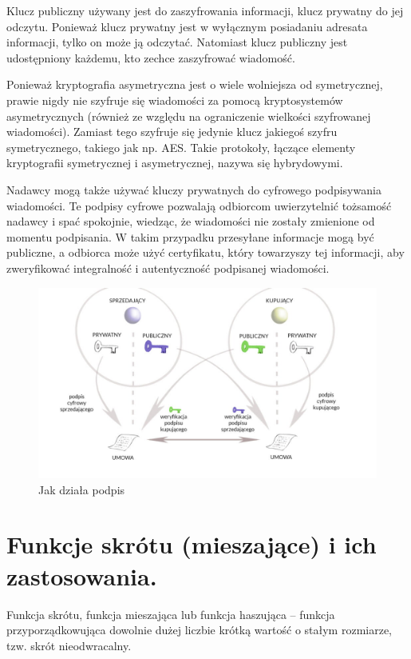 \documentclass[a4paper,12pt,oneside]{book}
\begin{document}
			Klucz publiczny używany jest do zaszyfrowania informacji, klucz prywatny do jej odczytu. Ponieważ klucz prywatny jest w wyłącznym posiadaniu adresata informacji, tylko on może ją odczytać. Natomiast klucz publiczny jest udostępniony każdemu, kto zechce zaszyfrować wiadomość.
			
			Ponieważ kryptografia asymetryczna jest o wiele wolniejsza od symetrycznej, prawie nigdy nie szyfruje się wiadomości za pomocą kryptosystemów asymetrycznych (również ze względu na ograniczenie wielkości szyfrowanej wiadomości). Zamiast tego szyfruje się jedynie klucz jakiegoś szyfru symetrycznego, takiego jak np. AES. Takie protokoły, łączące elementy kryptografii symetrycznej i asymetrycznej, nazywa się hybrydowymi.
			
			Nadawcy mogą także używać kluczy prywatnych do cyfrowego podpisywania wiadomości. Te podpisy cyfrowe pozwalają odbiorcom uwierzytelnić tożsamość nadawcy i spać spokojnie, wiedząc, że wiadomości nie zostały zmienione od momentu podpisania. W takim przypadku przesyłane informacje mogą być publiczne, a odbiorca może użyć certyfikatu, który towarzyszy tej informacji, aby zweryfikować integralność i autentyczność podpisanej wiadomości.
			
			\begin{figure}[h]
				\centering\includegraphics[scale=0.35]{krypt_asym_podpis.png}
				\caption{Jak działa podpis}
			\end{figure}
		
		\setcounter{section}{1}
		\section{Funkcje skrótu (mieszające) i ich zastosowania. }
		
			Funkcja skrótu, funkcja mieszająca lub funkcja haszująca – funkcja przyporządkowująca dowolnie dużej liczbie krótką wartość o stałym rozmiarze, tzw. skrót nieodwracalny.\\
			
\end{document}
